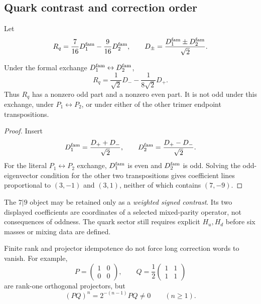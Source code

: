 \documentclass[11pt,a4paper]{article}
\begin{document}
\subsection{Quark contrast and correction order}
\label{p6:sec:quark-contrast-corrections}

Let
\[
R_q=\frac7{16}D^{\mathrm{fam}}_1-\frac9{16}D^{\mathrm{fam}}_2,
\qquad
D_\pm=\frac{D^{\mathrm{fam}}_1\pm D^{\mathrm{fam}}_2}{\sqrt2}.
\]

\begin{theorem}
\label{p6:thm:quark-mixed-parity}
Under the formal exchange
\(D^{\mathrm{fam}}_1\leftrightarrow D^{\mathrm{fam}}_2\),
\[
R_q
=
\frac1{\sqrt2}D_-
-\frac1{8\sqrt2}D_+.
\]
Thus \(R_q\) has a nonzero odd part and a nonzero even part.  It is not odd
under this exchange, under \(P_1\leftrightarrow P_2\), or under either of the
other trimer endpoint transpositions.
\end{theorem}

\begin{proof}
Insert
\[
D^{\mathrm{fam}}_1=\frac{D_++D_-}{\sqrt2},
\qquad
D^{\mathrm{fam}}_2=\frac{D_+-D_-}{\sqrt2}.
\]
For the literal \(P_1\leftrightarrow P_2\) exchange,
\(D^{\mathrm{fam}}_1\) is even and \(D^{\mathrm{fam}}_2\) is odd.  Solving the odd-eigenvector
condition for the other two transpositions gives coefficient lines
proportional to \((3,-1)\) and \((3,1)\), neither of which contains
\((7,-9)\).
\end{proof}

\begin{corollary}
\label{p6:cor:quark-contrast-status}
The \(7|9\) object may be retained only as a \emph{weighted signed contrast}.
Its two displayed coefficients are coordinates of a selected mixed-parity
operator, not consequences of oddness.  The quark sector still requires
explicit \(H_u,H_d\) before six masses or mixing data are defined.
\end{corollary}

\begin{theorem}
\label{p6:thm:no-rank-terminality}
Finite rank and projector idempotence do not force long correction words to
vanish.  For example,
\[
P=
\begin{pmatrix}1&0\\0&0\end{pmatrix},
\qquad
Q=\frac12
\begin{pmatrix}1&1\\1&1\end{pmatrix}
\]
are rank-one orthogonal projectors, but
\[
(PQ)^n=2^{-(n-1)}PQ\ne0
\qquad(n\ge1).
\]
\end{theorem}
\end{document}
